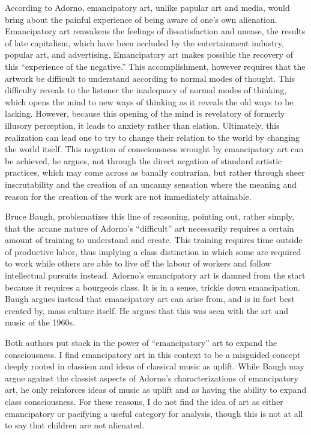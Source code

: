 \documentclass[12pt,letterpaper]{article}
\begin{document}
	According to Adorno, emancipatory art, unlike papular art and media, 
	would bring about the painful experience of being aware of one's own 
	alienation. Emancipatory art reawakens the feelings of dissatisfaction 
	and unease, the results of late capitalism, which have been occluded by
	the entertainment industry, popular art, and advertising. Emancipatory 
	art makes possible the recovery of this ``experience of the negative.''
	This accomplishment, however requires that the artwork be difficult to 
	understand according to normal modes of thought. This difficulty reveals
	to the listener the inadequacy of normal modes of thinking, which opens 
	the mind to new ways of thinking as it reveals the old ways to be 
	lacking. However, because this opening of the mind is revelatory of 
	formerly illusory perception, it leads to anxiety rather than elation. 
	Ultimately, this realization can lead one to try to change their 
	relation to the world by changing the world 
	itself.\autocite[67--69]{Baugh}    
	This negation of consciousness wrought by emancipatory art can be 
	achieved, he argues, not through the direct negation of standard 
	artistic practices, which may come across as banally contrarian, but 
	rather through sheer inscrutability and the creation of an uncanny 
	sensation where the meaning and reason for the creation of the work are
	not immediately attainable.\autocite[71]{Baugh}
	
	Bruce Baugh, problematizes this line of reasoning, pointing out, rather
	simply, that the arcane nature of Adorno's ``difficult'' art necessarily
	requires a certain amount of training to understand and create. This 
	training requires time outside of productive labor, thus implying a 
	class distinction in which some are required to work while others are 
	able to live off the labour of workers and follow intellectual pursuits
	instead. Adorno's emancipatory art is damned from the start because it 
	requires a bourgeois class. \autocite[74]{Baugh} It is in a sense, 
	trickle down emancipation. Baugh argues instead that emancipatory art 
	can arise from,
	and is in fact best created by, mass culture itself. He argues that this
	was seen with the art and music of the 1960s.\autocite[77]{Baugh}

	Both authors put stock in the power of ``emancipatory'' art to expand 
	the consciousness. I find emancipatory art in this context to be a 
	misguided concept deeply rooted in classism and ideas of classical music
	as uplift. While Baugh may argue against the classist aspects of Adorno's
	characterizations of emancipatory art, he only reinforces ideas of music 
	as uplift and as having the ability to expand class consciousness.
	For these reasons, I do not 
	find the idea of art as either emancipatory or pacifying a useful
	category for analysis, though this is not at all to say that children
	are not alienated. 
\end{document}
